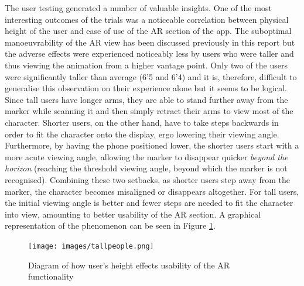 \documentclass{l4proj}
\begin{document}
The user testing generated a number of valuable insights. One of the most interesting outcomes of the trials was a noticeable correlation between physical height of the user and ease of use of the AR section of the app. The suboptimal manoeuvrability of the AR view has been discussed previously in this report but the adverse effects were experienced noticeably less by users who were taller and thus viewing the animation from a higher vantage point. Only two of the users were significantly taller than average (6'5 and 6'4) and it is, therefore, difficult to generalise this observation on their experience alone but it seems to be logical. Since tall users have longer arms, they are able to stand further away from the marker while scanning it and then simply retract their arms to view most of the character. Shorter users, on the other hand, have to take steps backwards in order to fit the character onto the display, ergo lowering their viewing angle. Furthermore, by having the phone positioned lower, the shorter users start with a more acute viewing angle, allowing the marker to disappear quicker \textit{beyond the horizon} (reaching the threshold viewing angle, beyond which the marker is not recognised). Combining these two setbacks, as shorter users step away from the marker, the character becomes misaligned or disappears altogether. For tall users, the initial viewing angle is better and fewer steps are needed to fit the character into view, amounting to better usability of the AR section. A graphical representation of the phenomenon can be seen in Figure \ref{fig:heightAR}. 

\begin{figure}
\centering
\texttt{[image: images/tallpeople.png]}
\caption{Diagram of how user's height effects usability of the AR functionality} 
\label{fig:heightAR}
\end{figure}
\end{document}
